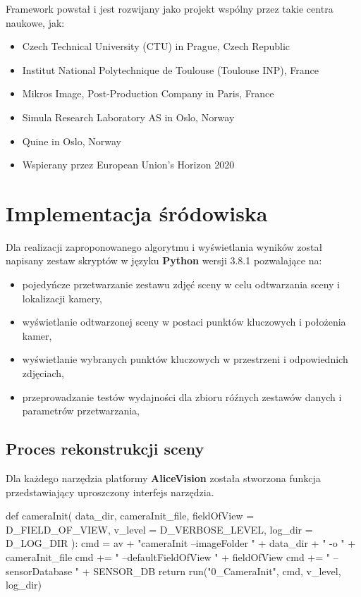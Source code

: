 Framework powstał i jest rozwijany jako projekt wspólny przez takie centra naukowe, jak:
\begin{itemize}
   \item Czech Technical University (CTU) in Prague, Czech Republic
   \item Institut National Polytechnique de Toulouse (Toulouse INP), France
   \item Mikros Image, Post-Production Company in Paris, France
   \item Simula Research Laboratory AS in Oslo, Norway
   \item Quine in Oslo, Norway
   \item Wspierany przez European Union’s Horizon 2020
\end{itemize}

\section{Implementacja śródowiska}

Dla realizacji zaproponowanego algorytmu i wyświetlania wyników został napisany zestaw skryptów w języku \textbf{Python} wersji 3.8.1 pozwalające na:
\begin{itemize}
   \item pojedyńcze przetwarzanie zestawu zdjęć sceny w celu odtwarzania sceny i lokalizacji kamery,
   \item wyświetlanie odtwarzonej sceny w postaci punktów kluczowych i położenia kamer,
   \item wyświetlanie wybranych punktów kluczowych w przestrzeni i odpowiednich zdjęciach,
   \item przeprowadzanie testów wydajności dla zbioru róźnych zestawów danych i parametrów przetwarzania,
\end{itemize}

\subsection{Proces rekonstrukcji sceny}

Dla każdego narzędzia platformy \textbf{AliceVision} została stworzona funkcja przedstawiający uproszczony interfejs narzędzia.

\begin{python}
def cameraInit(
 data_dir,
 cameraInit_file,
 fieldOfView = D_FIELD_OF_VIEW,
 v_level = D_VERBOSE_LEVEL,
 log_dir = D_LOG_DIR
):
    cmd = av + "cameraInit --imageFolder " + data_dir + " -o " + cameraInit_file
    cmd += " --defaultFieldOfView " + fieldOfView
    cmd += " --sensorDatabase " + SENSOR_DB
    return run("0_CameraInit", cmd, v_level, log_dir)
\end{python}

